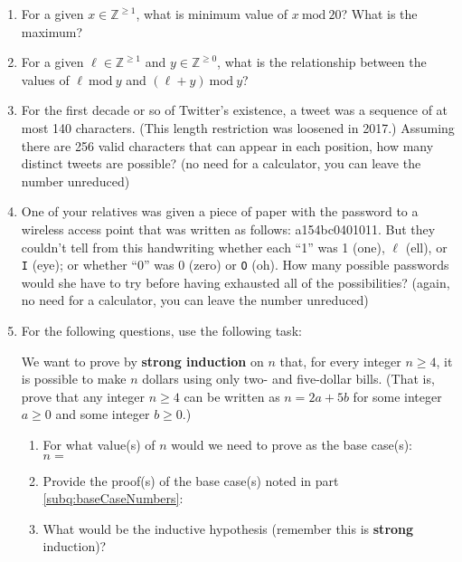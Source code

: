 \documentclass[11pt, oneside]{article}   	%
\renewcommand{\mod}{\ \mathrm{mod}\ }
\begin{document}
\clearpage
\begin{enumerate}

\item
For a given $x\in\mathbb{Z}^{\ge1}$, what is minimum value of \underline{$x\mod 20$}? What is the maximum? 
\vspace{3em}

\item 
For a given $\ell \in\mathbb{Z}^{\ge1}$ and $y\in\mathbb{Z}^{\ge0}$, what is the relationship between the values of \underline{$\ell\mod y$} and \underline{$(\ell + y) \mod y$}?
\vspace{3em}


\item
For the first decade or so of Twitter’s existence, a tweet was a sequence of at most 140 characters. (This length restriction was loosened in 2017.) Assuming there are 256 valid characters that can appear in each position, how many distinct tweets are possible? (no need for a calculator, you can leave the number unreduced)
\vspace{6em}

\item 
One of your relatives was given a piece of paper with the password to a wireless access point that was written as follows: a154bc0401011. 
But they couldn’t tell from this handwriting whether each “1” was 1 (one), $\ell$ (ell), or \texttt{I} (eye); 
or whether “0” was $0$ (zero) or \texttt{O} (oh). 
How many possible passwords would she have to try before having exhausted all of the possibilities? 
(again, no need for a calculator, you can leave the number unreduced)

\vspace{6em}

\item For the following questions, use the following task:

We want to prove by \textbf{strong induction} on $n$ that,
for every integer $n\ge4$,
it is possible to make $n$ dollars using only two- and five-dollar bills. 
(That is, prove that any integer $n\ge4$ can be written as $n = 2a + 5b$ for some integer $a \ge 0$ and some integer $b\ge 0$.)

\begin{enumerate}
\item \label{subq:baseCaseNumbers}For what value(s) of $n$ would we need to prove as the base case(s):  \vspace*{1em}\\\hspace*{4em}$n=$\\
\item Provide the proof(s) of the base case(s) noted in part \ref{subq:baseCaseNumbers}:
\vspace{6em}
\item What would be the inductive hypothesis (remember this is \textbf{strong} induction)? 
\vspace{6em}


\end{enumerate}
\end{enumerate}
\end{document}
